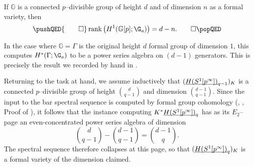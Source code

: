 \begin{lemma}
If \(\mathbb G\) is a connected \(p\)--divisible group of height \(d\) and of dimension \(n\) as a formal variety, then
\[\pushQED{\qed}
\operatorname{rank}\left(H^1(\mathbb G[p]; \G_a)\right) = d - n. \qedhere
\popQED\]
\end{lemma}

\begin{remark}
In the case where \(\mathbb G = \Gamma\) is the original height \(d\) formal group of dimension \(1\), this computes \(H^*(\Gamma; \G_a)\) to be a power series algebra on \((d-1)\) generators.  This is precisely the result we recorded by hand in .
\end{remark}

\noindent Returning to the task at hand, we assume inductively that \((\underline{\smash{H(S^1[p^\infty])}}_{q-1})_K\) is a connected \(p\)--divisible group of height \(\binom{d}{q-1}\) and dimension \(\binom{d-1}{q-1}\).  Since the input to the bar spectral sequence is computed by formal group cohomology (\cite{LazarevDeformations}, \cite[Example 2.3.5]{HopkinsLurie}, Proof of ), it follows that the instance computing \(K^* \underline{\smash{H(S^1[p^\infty])}}_{q}\) has as its \(E_2\)--page an even-concentrated power series algebra of dimension \[\binom{d}{q-1} - \binom{d-1}{q-1} = \binom{d-1}{q}.\]  The spectral sequence therefore collapses at this page, so that \((\underline{\smash{H(S^1[p^\infty])}}_{q})_K\) is a formal variety of the dimension claimed.

